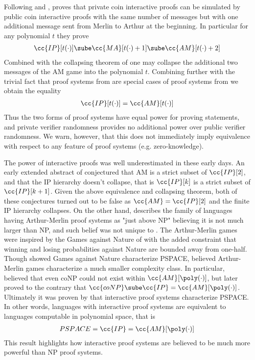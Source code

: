 Following \cite{GMR85} and \cite{Bab85}, \cite{GS86} proves that private coin interactive proofs can be simulated by public coin interactive proofs with the same number of messages but with one additional message sent from Merlin to Arthur at the beginning.
In particular for any polynomial $t$ they prove
\begin{align}
    \cc{IP}[t(\cdot)] \sube \cc{MA}[t(\cdot)+1] \sube \cc{AM}[t(\cdot)+2]
\end{align}
Combined with the collapsing theorem of \cite{Bab85} one may collapse the additional two messages of the AM game into the polynomial $t$.
Combining further with the trivial fact that proof systems from \cite{Bab85} are special cases of proof systems from \cite{GMR85} we obtain the equality
\begin{align}
    \cc{IP}[t(\cdot)] = \cc{AM}[t(\cdot)]
\end{align}
Thus the two forms of proof systems have equal power for proving statements, and private verifier randomness provides no additional power over public verifier randomness.
We warn, however, that this does not immediately imply equivalence with respect to any feature of proof systems (e.g. zero-knowledge).

The power of interactive proofs was well underestimated in these early days.
An early extended abstract of \cite{GMR85} conjectured that AM is a strict subset of $\cc{IP}[2]$, and that the IP hierarchy doesn't collapse, that is $\cc{IP}[k]$ is a strict subset of $\cc{IP}[k+1]$.
Given the above equivalence and collapsing theorem, both of these conjectures turned out to be false as $\cc{AM} = \cc{IP}[2]$ and the finite IP hierarchy collapses.
On the other hand, \cite{Bab85} describes the family of languages having Arthur-Merlin proof systems as "just above NP" believing it is not much larger than NP, and such belief was not unique to \cite{Bab85}.
The Arthur-Merlin games were inspired by the Games against Nature of \cite{Pap84} with the added constraint that winning and losing probabilities against Nature are bounded away from one-half.
Though \cite{Pap84} showed Games against Nature characterize PSPACE, \cite{Bab85} believed Arthur-Merlin games characterize a much smaller complexity class.
In particular, \cite{Bab85} believed that even coNP could not exist within $\cc{AM}[\poly(\cdot)]$, but later \cite{FKLN92} proved to the contrary that $\cc{coNP} \sube \cc{IP} = \cc{AM}[\poly(\cdot)]$.
Ultimately it was proven by \cite{Sha92} that interactive proof systems characterize PSPACE.
In other words, languages with interactive proof systems are equivalent to languages computable in polynomial space, that is
\begin{align}
    PSPACE = \cc{IP} = \cc{AM}[\poly(\cdot)]
\end{align}
This result highlights how interactive proof systems are believed to be much more powerful than NP proof systems.


